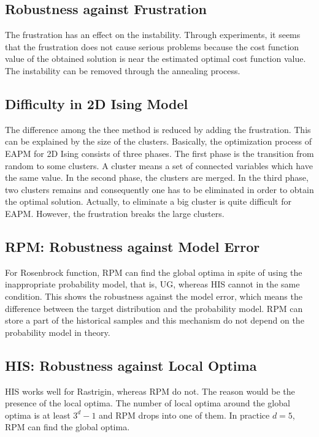 \subsection{Robustness against Frustration}
The frustration has an effect on the instability.
Through experiments, 
it seems that 
the frustration does not cause serious problems
because the cost function value of the obtained solution is 
near the estimated optimal cost function value.
The instability can be removed through 
the annealing process.


\subsection{Difficulty in 2D Ising Model}
The difference among the thee method is reduced by adding the frustration.
This can be explained by the 
size of the clusters.
Basically, the optimization process of EAPM for 2D Ising consists of
three phases.
The first phase is the transition from random to some clusters.
A cluster means 
a set of connected variables which have the same value.
In the second phase, the clusters are merged.
In the third phase, two clusters remains and consequently one has to be
eliminated
in order to obtain the optimal solution.
Actually, to eliminate a big cluster is quite difficult for EAPM.
However, the frustration breaks the large clusters.


\subsection{RPM: Robustness against Model Error}
For Rosenbrock function,
RPM can find the global optima in spite of using 
the inappropriate probability model, that is, UG,
whereas HIS cannot in the same condition.
This shows the robustness against the model error,
which means the difference 
between the target distribution and the probability model.
RPM can store a part of the historical samples and
this mechanism do not depend on the probability model in theory.



\subsection{HIS: Robustness against Local Optima}
HIS works well for Rastrigin,
whereas RPM do not.
The reason would be the presence of the local optima.
The number of local optima around the global optima is
at least $3^{d}-1$ and RPM drops into one of them.
In practice $d=5$, RPM can find the global optima.

